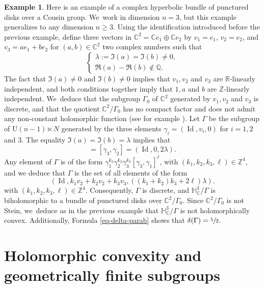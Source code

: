 \documentclass[11pt]{article}
\theoremstyle{definition}
\newtheorem*{example}{Example}
\newcommand{\C}{\mathbb{C}}
\newcommand{\R}{\mathbb{R}}
\newcommand{\Z}{\mathbb{Z}}
\DeclareMathOperator{\Id}{Id}
\def\C{\mathbb{C}}
\begin{document}
\begin{example}Here is an example of a complex hyperbolic bundle of punctured disks over a Cousin group. We~work in dimension $n=3$, but this example generalizes to any dimension $n\ge3$. Using the identification introduced before the previous example, define three vectors in $\C^{2}=\C e_1\oplus \C e_2$ by $v_1=e_1$, $v_2=e_2$, and $v_3=ae_1+be_2$ for $(a,b)\in \C^{2}$ two complex numbers such that
\begin{equation*}
\left\{\begin{array}{l}
\lambda:=\Im(a)=\Im(b)\ne 0, \\
\Re(a)-\Re(b) \notin \mathbb{Q}.
\end{array}\right.
\end{equation*}
The fact that $\Im(a)\ne0$ and $\Im(b)\ne0$ implies that $v_1,v_2$ and $v_3$ are $\R$-linearly independent, and both conditions together imply that $1,a$ and $b$ are $\Z$-linearly independent. We~deduce that the subgroup $\Gamma_0$ of $\C^{2}$ generated by $v_1,v_2$ and $v_3$ is discrete, and that the quotient $\C^{2}/\Gamma_0$ has no compact factor and does not admit any non-constant holomorphic function (see for example \cite[pp.\,451-452]{napierConvexityPropertiesCoverings1990}).
Let $\Gamma$ be the subgroup of $\mathrm{U}(n-1)\ltimes N$ generated by the three elements $\gamma_i=(\Id,v_i,0)$ for $i=1,2$ and $3$.
The equality $\Im(a)=\Im(b)=\lambda$ implies that
\begin{equation*}
[\gamma_3,\gamma_1]=[\gamma_3,\gamma_2] = (\Id,0,2\lambda).
\end{equation*}
Any element of $\Gamma$ is of the form $\gamma_1^{k_2}\gamma_2^{k_2}\gamma_3^{k_3}[\gamma_3,\gamma_1]^{\ell}$,
with $(k_1,k_2,k_3,\ell)\in \Z^{4}$, and we deduce that $\Gamma$ is the set of all elements of the form
\begin{equation*}
(\Id,k_1v_2+k_2v_2+k_3v_3,((k_1+k_2)k_3+2\ell)\lambda).
\end{equation*}
with $(k_1,k_2,k_3,\ell)\in \Z^{4}$. Consequently, $\Gamma$ is discrete, and $\mathbb{H}^{3}_{\C}/\Gamma$ is biholomorphic to a bundle of punctured disks over $\C^{2}/\Gamma_0$. Since $\C^{2}/\Gamma_0$ is not Stein, we~deduce as in the previous example that $\mathbb{H}^{3}_{\C}/\Gamma$ is not holomorphically convex. Additionally, Formula \eqref{eq-delta-parab} shows that $\delta(\Gamma)=\sfrac{5}{2}$.
\end{example}

\section{Holomorphic convexity and geometrically finite subgroups}\label{section-hol-cvx-geom-fini}
\end{document}
